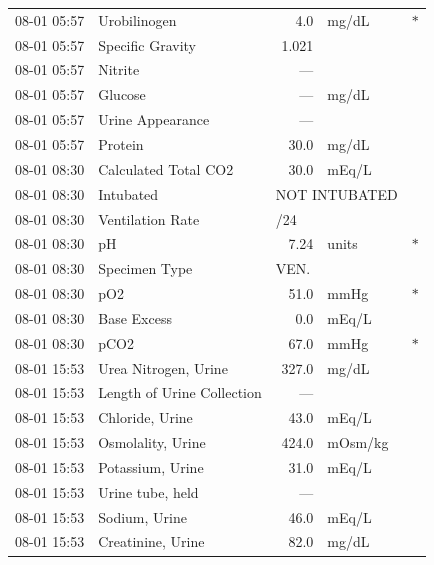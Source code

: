 \documentclass[12pt, a4paper]{article}
\begin{document}
{\begin{longtable}{l p{4.5cm} r l c}
08-01 05:57 & Urobilinogen                   & 4.0    & mg/dL  & $*$ \\
08-01 05:57 & Specific Gravity               & 1.021  &        &     \\
08-01 05:57 & Nitrite                        & ---    &        &     \\
08-01 05:57 & Glucose                        & ---    & mg/dL  &     \\
08-01 05:57 & Urine Appearance               & ---    &        &     \\
08-01 05:57 & Protein                        & 30.0   & mg/dL  &     \\
08-01 08:30 & Calculated Total CO2           & 30.0   & mEq/L  &     \\
08-01 08:30 & Intubated                      & \multicolumn{2}{l}{NOT INTUBATED} &  \\
08-01 08:30 & Ventilation Rate               & \multicolumn{2}{l}{/24} &          \\
08-01 08:30 & pH                             & 7.24   & units  & $*$ \\
08-01 08:30 & Specimen Type                  & \multicolumn{2}{l}{VEN.} &         \\
08-01 08:30 & pO2                            & 51.0   & mmHg   & $*$ \\
08-01 08:30 & Base Excess                    & 0.0    & mEq/L  &     \\
08-01 08:30 & pCO2                           & 67.0   & mmHg   & $*$ \\
08-01 15:53 & Urea Nitrogen, Urine           & 327.0  & mg/dL  &     \\
08-01 15:53 & Length of Urine Collection     & ---    &        &     \\
08-01 15:53 & Chloride, Urine                & 43.0   & mEq/L  &     \\
08-01 15:53 & Osmolality, Urine              & 424.0  & mOsm/kg&     \\
08-01 15:53 & Potassium, Urine               & 31.0   & mEq/L  &     \\
08-01 15:53 & Urine tube, held               & ---    &        &     \\
08-01 15:53 & Sodium, Urine                  & 46.0   & mEq/L  &     \\
08-01 15:53 & Creatinine, Urine              & 82.0   & mg/dL  &     \\

\end{longtable}}
\end{document}
